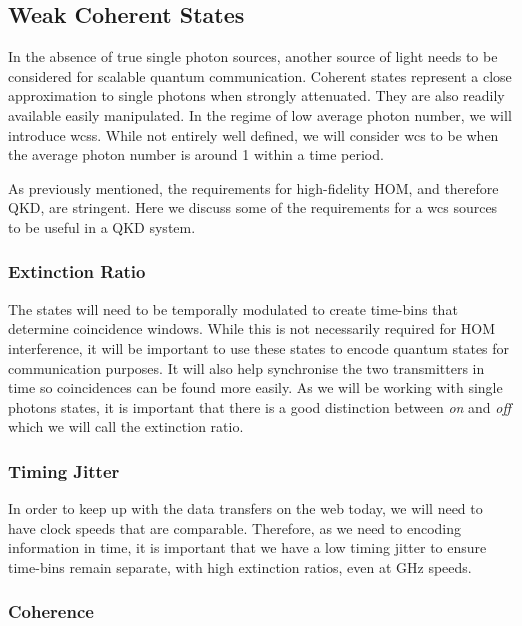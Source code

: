 \subsection{Weak Coherent States}

In the absence of true single photon sources, another source of light needs to be considered for scalable quantum communication. Coherent states represent a close approximation to single photons when strongly attenuated. They are also readily available easily manipulated. In the regime of low average photon number, we will introduce \acp{wcs}. While not entirely well defined, we will consider \ac{wcs} to be when the average photon number is around 1 within a time period.

As previously mentioned, the requirements for high-fidelity \ac{HOM}, and therefore \ac{QKD}, are stringent. Here we discuss some of the requirements for a \ac{wcs} sources to be useful in a \ac{QKD} system. 

\subsubsection*{Extinction Ratio}

The states will need to be temporally modulated to create time-bins that determine coincidence windows. While this is not necessarily required for \ac{HOM} interference, it will be important to use these states to encode quantum states for communication purposes. It will also help synchronise the two transmitters in time so coincidences can be found more easily. As we will be working with single photons states, it is important that there is a good distinction between \textit{on} and \textit{off} which we will call the extinction ratio. 

\subsubsection*{Timing Jitter}

In order to keep up with the data transfers on the web today, we will need to have clock speeds that are comparable. Therefore, as we need to encoding information in time, it is important that we have a low timing jitter to ensure time-bins remain separate, with high extinction ratios, even at GHz speeds.

\subsubsection*{Coherence}

